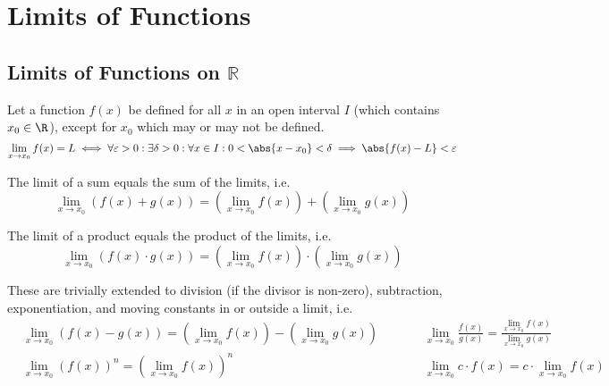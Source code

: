 \documentclass{article}
\begin{document}
\section{Limits of Functions}
\subsection{Limits of Functions on \texorpdfstring{\(\mathbb{R}\)}{the Reals}}
\begin{definition}
    Let a function \(f(x)\) be defined for all \(x\) in an open interval \(I\)
    (which contains \(x_0 \in \R\)), except for \(x_0\) which may or may not be defined.
    \begin{equation*}
        \lim_{x\to x_0} f(x) = L \iff \forall\varepsilon>0: \exists\delta>0: \forall x \in I: 0<\abs{x-x_0}<\delta \implies \abs{f(x)-L}<\varepsilon
    \end{equation*}
\end{definition}
%
\begin{tcolorboxlarge}[title={Limit Laws for Functions}]
    \begin{theorem} The limit of a sum equals the sum of the limits, i.e.
        \begin{equation*}
            \lim_{x\to x_0}\left(f(x)+g(x)\right)
            = \left(\lim_{x\to x_0}f(x)\right) + \left(\lim_{x\to x_0}g(x)\right)
        \end{equation*}
    \end{theorem}
    \begin{theorem} The limit of a product equals the product of the limits, i.e.
        \begin{equation*}
            \lim_{x\to x_0}\left(f(x)\cdot g(x)\right)
            = \left(\lim_{x\to x_0}f(x)\right) \cdot \left(\lim_{x\to x_0}g(x)\right)
        \end{equation*}
    \end{theorem}
    These are trivially extended to
    division (if the divisor is non-zero),
    subtraction, exponentiation, and moving constants in or outside a limit, i.e.
    \begin{align*}
         & \lim_{x\to x_0}\left(f(x) - g(x)\right)
        = \left(\lim_{x\to x_0}f(x)\right) - \left(\lim_{x\to x_0}g(x)\right)
         & \qquad
         & \lim_{x\to x_0}\frac{f(x)}{g(x)}
        = \frac{\lim_{x\to x_0}f(x)}{\lim_{x\to x_0}g(x)}
        \\
         & \lim_{x\to x_0}\left(f(x)\right)^n
        = \left(\lim_{x\to x_0}f(x)\right)^n
         & \qquad
         & \lim_{x\to x_0} c \cdot f(x)
        = c \cdot \lim_{x\to x_0}f(x)
    \end{align*}
\end{tcolorboxlarge}
\end{document}
